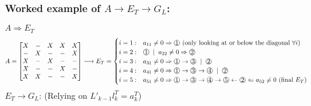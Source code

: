 \documentclass{article}
\newcommand*\circled[1]{\raisebox{.5pt}{\textcircled{\raisebox{-.9pt} {#1}}}}
\begin{document}
\subsubsection{Worked example of $A \longrightarrow E_T \longrightarrow G_L$:}
$A \Longrightarrow E_T$
\begin{align*}
    A = \begin{bmatrix}
        X &- &X &X &X\\
        - &X &- &- &X\\
        X &- &X &- &-\\
        X &- & -& X &-\\
        X &X &- &- &X
    \end{bmatrix}
    \longrightarrow E_T = \begin{cases}
        i=1: & a_{11}\neq 0 \Rightarrow \circled{1} \textrm{ (only looking at or below the diagonal } \forall i)\\
        i=2: & \circled{1}\; \mid \; a_{22}\neq 0 \Rightarrow \circled{2}\\
        i=3: & a_{31}\neq 0 \Rightarrow \circled{1} \rightarrow \circled{3} \; \mid \; \circled{2}\\
        i=4: & a_{41} \neq 0 \Rightarrow \circled{1} \rightarrow \circled{3} \rightarrow \circled{4} \; \mid \; \circled{2}\\
        i=5: & a_{51} \neq 0 \Rightarrow \circled{1} \rightarrow \circled{3} \rightarrow \circled{4} \rightarrow \circled{5} \leftarrow \circled{2} \Leftarrow a_{52}\neq 0 \textrm{ (final $E_T$)}
    \end{cases}
\end{align*}
$E_T \longrightarrow G_L$: (Relying on $L'_{k-1}l_k^T = a_k^T$)
\end{document}
